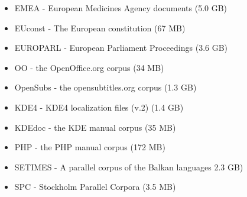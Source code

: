 \documentclass[a4paper,landscape,headrule,footrule,xetex]{foils}
\begin{document}
\begin{itemize} \addtolength{\itemsep}{-1ex}
\item EMEA - European Medicines Agency documents (5.0 GB)
\item EUconst - The European constitution (67 MB)
\item EUROPARL - European Parliament Proceedings (3.6 GB)
\item OO - the OpenOffice.org corpus (34 MB)
\item OpenSubs - the opensubtitles.org corpus (1.3 GB)
\item KDE4 - KDE4 localization files (v.2) (1.4 GB)
\item KDEdoc - the KDE manual corpus (35 MB)
\item PHP - the PHP manual corpus (172 MB)
\item SETIMES - A parallel corpus of the Balkan languages 2.3 GB)
\item SPC - Stockholm Parallel Corpora (3.5 MB)
\end{itemize}


\end{document}
